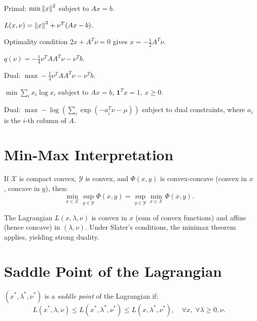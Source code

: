 \begin{example}
Primal: $\min \left\| x \right\|^2$ subject to $Ax = b$.

$L(x, \nu) = \left\| x \right\|^2 + \nu^T(Ax - b)$.

Optimality condition $2x + A^T\nu = 0$ gives $x = -\frac{1}{2}A^T\nu$.

$q(\nu) = -\frac{1}{4}\nu^TAA^T\nu - \nu^Tb$.

Dual: $\max -\frac{1}{4}\nu^TAA^T\nu - \nu^Tb$.
\end{example}

\begin{example}
$\min \sum_i x_i \log x_i$ subject to $Ax = b$, $\mathbf{1}^Tx = 1$, $x \geq 0$.

Dual: $\max -\log\left(\sum_i \exp(-a_i^T\nu - \mu)\right)$ subject to dual
constraints, where $a_i$ is the $i$-th column of $A$.
\end{example}

\section{Min-Max Interpretation}

\begin{theorem}
If $\mathcal{X}$ is compact convex, $\mathcal{Y}$ is convex, and $\Phi(x,y)$ is
convex-concave (convex in $x$, concave in $y$), then:
\[
    \min_{x \in \mathcal{X}} \sup_{y \in \mathcal{Y}} \Phi(x,y)
    = \sup_{y \in \mathcal{Y}} \min_{x \in \mathcal{X}} \Phi(x,y).
\]
\end{theorem}

\begin{remark}
The Lagrangian $L(x, \lambda, \nu)$ is convex in $x$ (sum of convex functions) and
affine (hence concave) in $(\lambda, \nu)$. Under Slater's conditions, the minimax
theorem applies, yielding strong duality.
\end{remark}

\section{Saddle Point of the Lagrangian}

\begin{definition}
$(x^*, \lambda^*, \nu^*)$ is a \emph{saddle point} of the Lagrangian if:
\[
    L(x^*, \lambda, \nu) \leq L(x^*, \lambda^*, \nu^*) \leq L(x, \lambda^*, \nu^*),
    \quad \forall x, \; \forall \lambda \geq 0, \nu.
\]
\end{definition}

